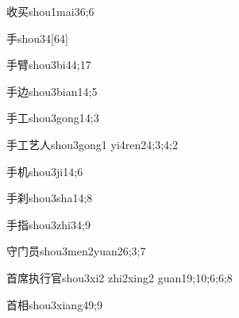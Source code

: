 \begin{verbete}{收买}{shou1mai3}{6;6}
\end{verbete}

\begin{verbete}{手}{shou3}{4}[64]
\end{verbete}

\begin{verbete}{手臂}{shou3bi4}{4;17}
\end{verbete}

\begin{verbete}{手边}{shou3bian1}{4;5}
\end{verbete}

\begin{verbete}{手工}{shou3gong1}{4;3}
\end{verbete}

\begin{verbete}{手工艺人}{shou3gong1 yi4ren2}{4;3;4;2}
\end{verbete}

\begin{verbete}{手机}{shou3ji1}{4;6}
\end{verbete}

\begin{verbete}{手刹}{shou3sha1}{4;8}
\end{verbete}

\begin{verbete}{手指}{shou3zhi3}{4;9}
\end{verbete}

\begin{verbete}{守门员}{shou3men2yuan2}{6;3;7}
\end{verbete}

\begin{verbete}{首席执行官}{shou3xi2 zhi2xing2 guan1}{9;10;6;6;8}
\end{verbete}

\begin{verbete}{首相}{shou3xiang4}{9;9}
\end{verbete}

